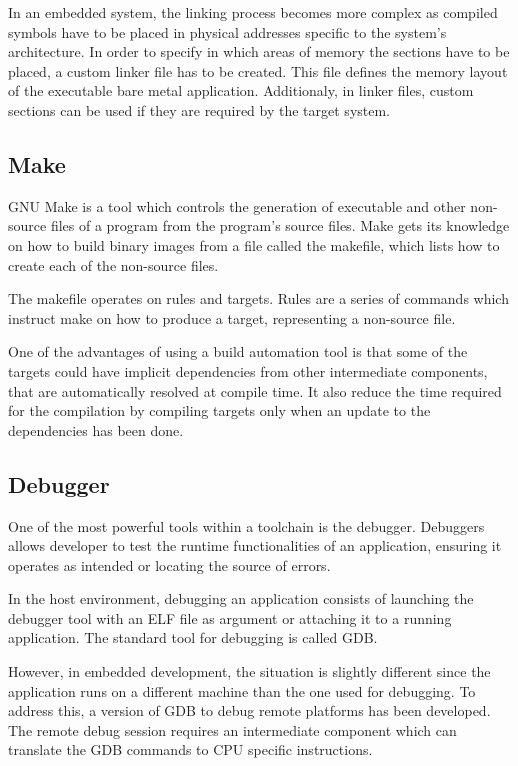 In an embedded system, the linking process becomes more complex as compiled 
symbols have to be placed in physical addresses specific to the system's
architecture.
In order to specify in which areas of memory the sections have to be placed,
a custom linker file has to be created. This file defines the memory layout of
the executable bare metal application.
Additionaly, in linker files, custom sections can be used if they are required
by the target system.

\subsection{Make}

GNU Make is a tool which controls the generation of executable and other
non-source files of a program from the program's source files. \cite{GNUMake}
Make gets its knowledge on how to build binary images from a file called
the makefile, which lists how to create each of the non-source files.

The makefile operates on rules and targets. Rules are a series of commands which
instruct make on how to produce a target, representing a non-source file.

One of the advantages of using a build automation tool is that some of the
targets could have implicit dependencies from other intermediate components,
that are automatically resolved at compile time.
It also reduce the time required for the compilation by compiling targets only
when an update to the dependencies has been done.

\subsection{Debugger}

One of the most powerful tools within a toolchain is the debugger. Debuggers
allows developer to test the runtime functionalities of an application,
ensuring it operates as intended or locating the source of errors.

In the host environment, debugging an application consists of launching the
debugger tool with an ELF file as argument or attaching it to a running
application. The standard tool for debugging is called GDB.

However, in embedded development, the situation is slightly different since the
application runs on a different machine than the one used for debugging.
To address this, a version of GDB to debug remote platforms has been developed.
The remote debug session requires an intermediate component which can translate
the GDB commands to CPU specific instructions.

